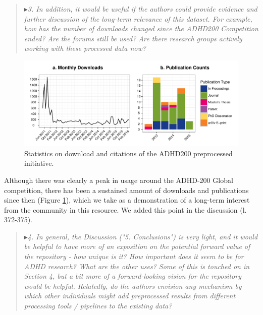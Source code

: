 \documentclass[authoryear,3p]{elsarticle}
\begin{document}
\begin{quote}
$\blacktriangleright$\emph{3. In addition, it would be useful if the authors could provide evidence and further discussion of the long-term relevance of this dataset. For example, how has the number of downloads changed since the ADHD200 Competition ended?  Are the forums still be used?  Are there research groups actively working with these processed data now?}
\end{quote}
\begin{figure}[!t]
\begin{center}
  \includegraphics[width=\linewidth]{impact_stats}
  \caption{Statistics on download and citations of the ADHD200 preprocessed initiative.}
  \label{fig:usage}
\end{center}
\end{figure}

Although there was clearly a peak in usage around the ADHD-200 Global competition, there has been a sustained amount of downloads and publications since then (Figure \ref{fig:usage}), which we take as a demonstration of a long-term interest from the community in this resource.  We added this point in the discussion (l. 372-375).


\begin{quote}
$\blacktriangleright$\emph{4. In general, the Discussion ("5. Conclusions") is very light, and it would be helpful to have more of an exposition on the potential forward value of the repository - how unique is it?  How important does it seem to be for ADHD research?  What are the other uses?  Some of this is touched on in Section 4, but a bit more of a forward-looking vision for the repository would be helpful.  Relatedly, do the authors envision any mechanism by which other individuals might add preprocessed results from different processing tools / pipelines to the existing data?
}
\end{quote}
\end{document}
